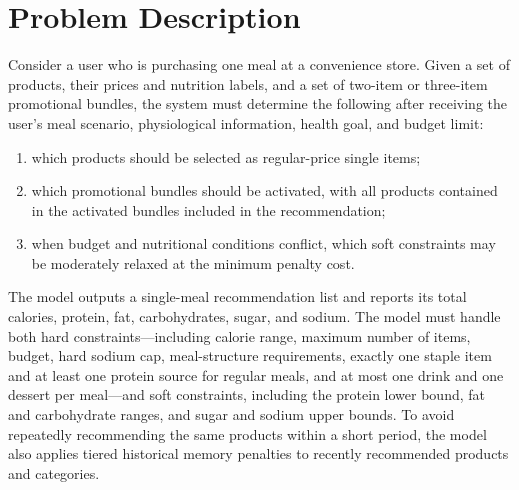 \documentclass[a4paper]{article}
\begin{document}
\section{Problem Description}
Consider a user who is purchasing one meal at a convenience store. Given a set of products, their prices and nutrition labels, and a set of two-item or three-item promotional bundles, the system must determine the following after receiving the user's meal scenario, physiological information, health goal, and budget limit:
\begin{enumerate}
\item which products should be selected as regular-price single items;
\item which promotional bundles should be activated, with all products contained in the activated bundles included in the recommendation;
\item when budget and nutritional conditions conflict, which soft constraints may be moderately relaxed at the minimum penalty cost.
\end{enumerate}

The model outputs a single-meal recommendation list and reports its total calories, protein, fat, carbohydrates, sugar, and sodium. The model must handle both hard constraints---including calorie range, maximum number of items, budget, hard sodium cap, meal-structure requirements, exactly one staple item and at least one protein source for regular meals, and at most one drink and one dessert per meal---and soft constraints, including the protein lower bound, fat and carbohydrate ranges, and sugar and sodium upper bounds. To avoid repeatedly recommending the same products within a short period, the model also applies tiered historical memory penalties to recently recommended products and categories.
\end{document}
